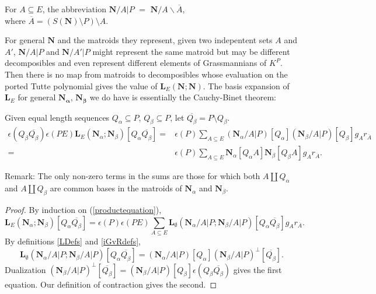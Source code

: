 \documentclass[Unicode]{cedram-alco}
\newcommand{\ext}[1]{\ensuremath{\mathbf{#1}}}
\newcommand{\eNal}{\ensuremath{\ext{N}_{\alpha}}}
\newcommand{\eNbe}{\ensuremath{\ext{N}_\beta}}
\newcommand{\dunion}{\coprod}
\newcommand{\extLHorSub}[3]{\ext{L}_{#1}\left(  {#2}; {#3}  \right)}
\begin{document}
\begin{defi}\label{NcontrArestrictP}
For $A\subseteq E$, the abbreviation $\ext{N}/A|P$ $=$
$\ext{N}/A\backslash \overline{A}$, \\
where $\overline{A}=(S(\ext{N})\setminus P)\setminus A$.
\end{defi}

For general $\ext{N}$ and the matroids they represent, given two indepentent sets $A$ and $A'$,
$\ext{N}/A|P$ and $\ext{N}/A'|P$ might represent the same matroid but may be
different decomposibles and even represent different elements of Grassmannians of $K^{P}$.
Then there is no map from matroids to decomposibles whose evaluation on the ported
Tutte polynomial gives the value of $\ext{L}_E( \ext{N} ; \ext{N} )$.  The basis
expansion of $\ext{L}_E$ for general $\ext{N_\alpha}$, $\ext{N_\beta}$ we do have is
essentially the Cauchy-Binet theorem:



\begin{coro} Given 
  equal length sequences $Q_\alpha \subseteq P$, $Q_\beta \subseteq P$,
  let $\overline{Q_\beta}=P\setminus Q_\beta$.
\label{common-basis-expansion}
\begin{equation}
  \begin{split}
    \epsilon(  Q_\beta \overline{Q_\beta} )\epsilon(PE)
    \extLHorSub{E}{\eNal}{\eNbe}  [Q_{\alpha}\overline{Q_{\beta}}]
    =& 
    \epsilon(P)\sum_{A\subseteq E}
    (\ext{N}_\alpha/A|P) [Q_\alpha]
    (\ext{N}_\beta/A|P) [Q_\beta] g_Ar_{\overline{A}} \\
    =& 
    \epsilon(P)\sum_{A\subseteq E}
    \ext{N}_\alpha[Q_\alpha A]
    \ext{N}_\beta [Q_\beta A]
    g_Ar_{\overline{A}}.
  \end{split}
\end{equation}

\end{coro}
Remark: The only non-zero terms in the sums are those for which both $A\dunion Q_\alpha$
and $A\dunion Q_\beta$ are common bases in the matroids of $\ext{N}_\alpha$ and $\ext{N}_\beta$.

\begin{proof}
  By induction on (\ref{productequation}),
  \[
  \extLHorSub{E}{\eNal}{\eNbe}  [Q_{\alpha}\overline{Q_{\beta}}] = \epsilon(P)\epsilon(PE)
  \sum_{A\subseteq E}\extLHorSub{\emptyset}{\ext{N}_\alpha/A|P}{\ext{N}_\beta/A|P}[Q_{\alpha}\overline{Q_{\beta}}]
  g_Ar_{\overline{A}}.
  \]
By definitions \ref{LDefs} and \ref{iGvRdefs}, 
  \[
\extLHorSub{\emptyset}{\ext{N}_\alpha/A|P}{\ext{N}_\beta/A|P}[Q_{\alpha}\overline{Q_{\beta}}]
=(\ext{N}_\alpha/A|P)[Q_\alpha](\ext{N}_\beta/A|P)^\perp[\overline{Q_{\beta}}].
\]
Dualization $(\ext{N}_\beta/A|P)^\perp[\overline{Q_{\beta}}]=
(\ext{N}_\beta/A|P)[Q_{\beta}]\epsilon(Q_\beta\overline{Q_\beta})$ gives the first equation.
Our definition of contraction gives the second.
\end{proof}
\end{document}
